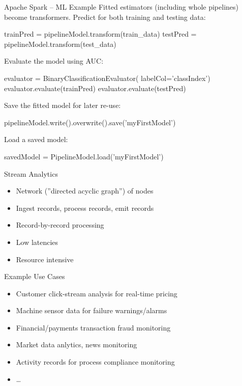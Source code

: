 \documentclass[ignorenonframetext,xcolor=x11names]{beamer}
\begin{document}
\begin{frame}[fragile]{Apache Spark -- ML Example}
Fitted estimators (including whole pipelines) become transformers. Predict for both training and testing data:
\begin{pythoncode}
trainPred = pipelineModel.transform(train_data)
testPred = pipelineModel.transform(test_data)
\end{pythoncode}
Evaluate the model using AUC:
\begin{pythoncode}
evaluator = BinaryClassificationEvaluator(
    labelCol='classIndex')
evaluator.evaluate(trainPred)
evaluator.evaluate(testPred)
\end{pythoncode}
Save the fitted model for later re-use:
\begin{pythoncode}
pipelineModel.write().overwrite().save('myFirstModel')
\end{pythoncode}
Load a saved model:
\begin{pythoncode}
savedModel = PipelineModel.load('myFirstModel')
\end{pythoncode}
\end{frame}


\begin{frame}{Stream Analytics}
\begin{itemize}
    \item Network (''directed acyclic graph'') of nodes
    \item Ingest records, process records, emit records
    \item Record-by-record processing
    \item Low latencies
    \item Resource intensive
\end{itemize}
\begin{block}{Example Use Cases}
\begin{itemize}
   \item Customer click-stream analysis for real-time pricing
   \item Machine sensor data for failure warnings/alarms
   \item Financial/payments transaction fraud monitoring
   \item Market data anlytics, news monitoring
   \item Activity records for process compliance monitoring
   \item \ldots
\end{itemize}
\end{block}

\end{frame}
\end{document}
